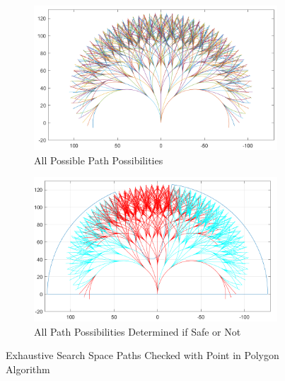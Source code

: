 \documentclass[12pt,onecolumn]{report}
\begin{document}
\begin{figure}
	\centering
	\begin{subfigure}[t]{0.49\columnwidth}
		\centering
		\includegraphics[width=\columnwidth]{Figs/MPCPath625.png}
		\caption{{\small All Possible Path Possibilities}}   
		\label{fig:Paths}
	\end{subfigure}
	\hfill
	\begin{subfigure}[t]{0.49\columnwidth}
		\centering
		\includegraphics[width=\columnwidth]{Figs/MPCPath625_withLIDAR.png}
		\caption{\small All Path Possibilities Determined if Safe or Not}   
		\label{fig:PathsSafe}
	\end{subfigure}
	\caption{\small Exhaustive Search Space Paths Checked with Point in Polygon Algorithm}
	\label{fig:SearchPaths}
\end{figure}
\end{document}
